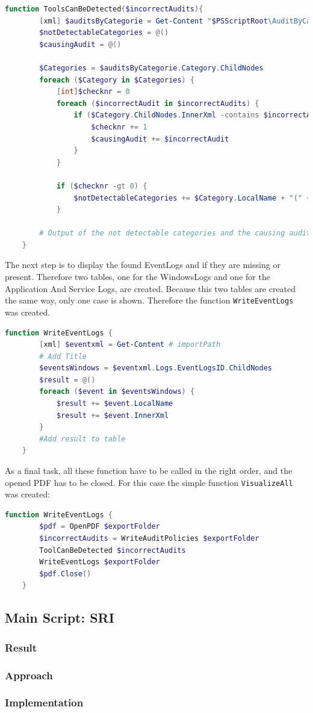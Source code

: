 \begin{lstlisting}[caption=Function ToolsCanBeDetected, language=PowerShell]
    function ToolsCanBeDetected($incorrectAudits){
        [xml] $auditsByCategorie = Get-Content "$PSScriptRoot\AuditByCategorie.xml"
        $notDetectableCategories = @()
        $causingAudit = @()

        $Categories = $auditsByCategorie.Category.ChildNodes
        foreach ($Category in $Categories) {
            [int]$checknr = 0
            foreach ($incorrectAudit in $incorrectAudits) {
                if ($Category.ChildNodes.InnerXml -contains $incorrectAudit) {
                    $checknr += 1
                    $causingAudit += $incorrectAudit
                }
            }
        
            if ($checknr -gt 0) {
                $notDetectableCategories += $Category.LocalName + "(" + $causingAudit + ")"
            }

        # Output of the not detectable categories and the causing audits    
    }
\end{lstlisting}
The next step is to display the found EventLogs and if they are missing or present. Therefore two tables, one for the WindowsLogs and one for the Application And Service Logs, are created. Because this two tables are created the same way, only one case is shown. Therefore the function \lstinline|WriteEventLogs| was created.
\begin{lstlisting}[caption=Function ToolsCanBeDetected, language=PowerShell]
    function WriteEventLogs { 
        [xml] $eventxml = Get-Content # importPath
        # Add Title
        $eventsWindows = $eventxml.Logs.EventLogsID.ChildNodes
        $result = @()
        foreach ($event in $eventsWindows) {
            $result += $event.LocalName
            $result += $event.InnerXml
        }
        #Add result to table
    }
\end{lstlisting}
As a final task, all these function have to be called in the right order, and the opened PDF has to be closed. For this case the simple function \lstinline|VisualizeAll| was created:
\begin{lstlisting}[caption=Function VisualizeAll, language=PowerShell]
    function WriteEventLogs { 
        $pdf = OpenPDF $exportFolder
        $incorrectAudits = WriteAuditPolicies $exportFolder
        ToolCanBeDetected $incorrectAudits
        WriteEventLogs $exportFolder
        $pdf.Close()
    }
\end{lstlisting}




\subsection{Main Script: SRI}
\subsubsection{Result}
\subsubsection{Approach}
\subsubsection{Implementation}